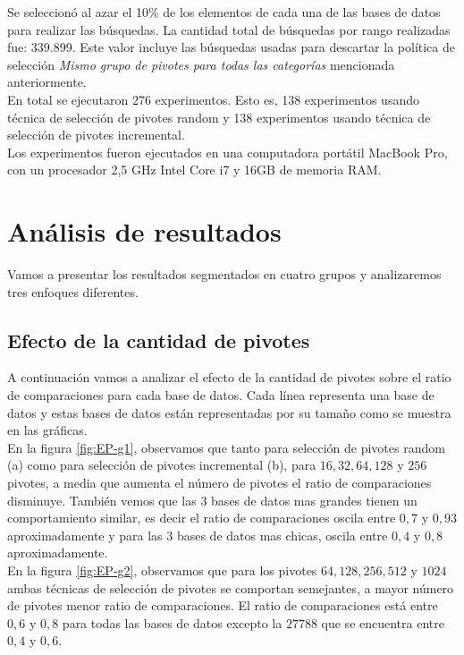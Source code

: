 Se seleccion\'o al azar el 10\% de los elementos de cada una de las bases de datos para realizar las b\'usquedas. La cantidad total de b\'usquedas por rango realizadas fue: 339.899. Este valor incluye las b\'usquedas usadas para descartar la pol\'itica de selecci\'on \textit{Mismo grupo de pivotes para todas las categor\'ias } mencionada anteriormente.\\

En total se ejecutaron 276 experimentos. Esto es, 138 experimentos usando t\'ecnica de selecci\'on de pivotes random y 138 experimentos usando t\'ecnica de selecci\'on de pivotes incremental.\\

Los experimentos fueron ejecutados en una computadora port\'atil MacBook Pro, con un procesador 2,5 GHz Intel Core i7 y 16GB de memoria RAM.

\section{An\'alisis de resultados}

Vamos a presentar los resultados segmentados en cuatro grupos y analizaremos tres enfoques diferentes.\\

\subsection{Efecto de la cantidad de pivotes}

A continuaci\'on vamos a analizar el efecto de la cantidad de pivotes sobre el ratio de comparaciones para cada base de datos. Cada l\'inea representa una base de datos y estas bases de datos est\'an representadas por su tamaño como se muestra en las gr\'aficas.\\

En la figura \ref{fig:EP-g1}, observamos que tanto para selecci\'on de pivotes random (a) como para selecci\'on de pivotes incremental (b), para $16, 32, 64, 128$ y $256$ pivotes, a media que aumenta el n\'umero de pivotes el ratio de comparaciones disminuye. Tambi\'en vemos que las 3 bases de datos mas grandes tienen un comportamiento similar, es decir el ratio de comparaciones oscila entre $0,7$ y $0,93$ aproximadamente y para las 3 bases de datos mas chicas, oscila entre $0,4$ y $0,8$ aproximadamente.\\

En la figura \ref{fig:EP-g2}, observamos que para los pivotes $64, 128, 256, 512$ y $1024$ ambas t\'ecnicas de selecci\'on de pivotes se comportan semejantes, a mayor n\'umero de pivotes menor ratio de comparaciones. El ratio de comparaciones est\'a entre $0,6$ y $0,8$ para todas las bases de datos excepto la $27788$ que se encuentra entre $0,4$ y $0,6$.\\

